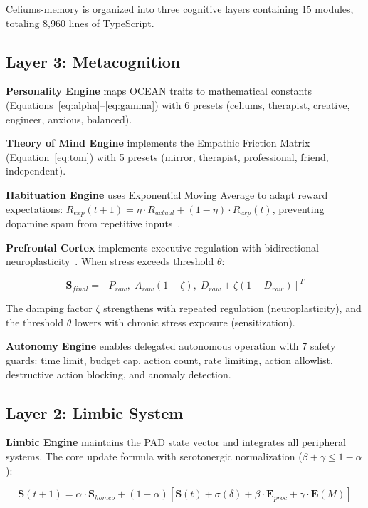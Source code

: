 \documentclass[journal,twoside]{IEEEtran}
\begin{document}
Celiums-memory is organized into three cognitive layers containing 15 modules, totaling 8,960 lines of TypeScript.

\subsection{Layer 3: Metacognition}

\textbf{Personality Engine} maps OCEAN traits to mathematical constants (Equations~\ref{eq:alpha}--\ref{eq:gamma}) with 6 presets (celiums, therapist, creative, engineer, anxious, balanced).

\textbf{Theory of Mind Engine} implements the Empathic Friction Matrix (Equation~\ref{eq:tom}) with 5 presets (mirror, therapist, professional, friend, independent).

\textbf{Habituation Engine} uses Exponential Moving Average to adapt reward expectations: $R_{exp}(t+1) = \eta \cdot R_{actual} + (1-\eta) \cdot R_{exp}(t)$, preventing dopamine spam from repetitive inputs~\cite{rankin2009, thompson2020}.

\textbf{Prefrontal Cortex} implements executive regulation with bidirectional neuroplasticity~\cite{ledoux2000, williams2020}. When stress exceeds threshold $\theta$:

\begin{equation}
\mathbf{S}_{final} = [P_{raw}, \; A_{raw}(1-\zeta), \; D_{raw} + \zeta(1-D_{raw})]^T
\label{eq:pfc}
\end{equation}

The damping factor $\zeta$ strengthens with repeated regulation (neuroplasticity), and the threshold $\theta$ lowers with chronic stress exposure (sensitization).

\textbf{Autonomy Engine} enables delegated autonomous operation with 7 safety guards: time limit, budget cap, action count, rate limiting, action allowlist, destructive action blocking, and anomaly detection.

\subsection{Layer 2: Limbic System}

\textbf{Limbic Engine} maintains the PAD state vector and integrates all peripheral systems. The core update formula with serotonergic normalization ($\beta + \gamma \leq 1 - \alpha$):

\begin{equation}
\mathbf{S}(t+1) = \alpha \cdot \mathbf{S}_{homeo} + (1-\alpha)[\mathbf{S}(t) + \sigma(\delta) + \beta \cdot \mathbf{E}_{proc} + \gamma \cdot \mathbf{E}(M)]
\label{eq:limbic}
\end{equation}
\end{document}
